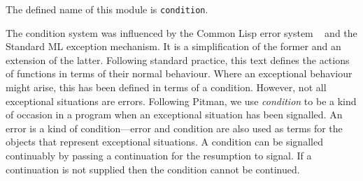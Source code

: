 \label{condition}
\gdef\module{condition}
%
\begin{optDefinition}
The defined name of this module is {\tt condition}.

The condition system was influenced by the Common Lisp error system
~  and the Standard
ML exception mechanism.  It is a simplification of
the former and an extension of the latter.  Following standard
practice, this text defines the actions of functions in terms of their
normal behaviour.  Where an exceptional behaviour might arise, this
has been defined in terms of a condition.  However, not all
exceptional situations are errors.  Following Pitman, we use {\em
condition} to be a kind of occasion in a program when
an exceptional situation has been signalled.  An error is a kind of
condition---error and condition are also used as terms for the objects
that represent exceptional situations.  A condition can be signalled
continuably by passing a continuation for the resumption to signal.
If a continuation is not supplied then the condition cannot be
continued.


\end{optDefinition}
